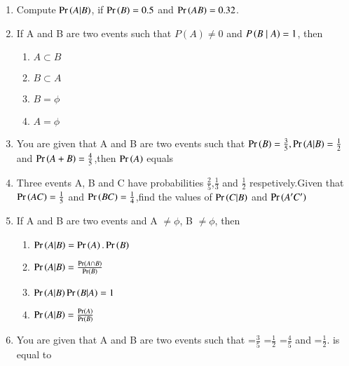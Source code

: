 \begin{enumerate}[label=\thesubsection.\arabic*,ref=\thesubsection.\theenumi]
\begin{enumerate}
\item {} \item {}
\end{enumerate}
\solution

\item Compute $\Pr\left(A|B\right)$, if $\Pr\left(B\right) = 0.5$ and $\Pr\left(AB\right) = 0.32$.\\
	\solution
	
	\item If A and B are two events such that $P(A) \neq 0$ and $P\left(B\mid A\right) = 1$, then
\begin{enumerate}
\item $A \subset B$\\
\item $B\subset A$\\
\item $B = \phi$\\
\item $A = \phi$\\
\end{enumerate}
		\solution
		
\item You are given that A and B are two events such that $\Pr\left(B\right)=\frac{3}{5},\Pr\left(A|B\right)=\frac{1}{2}$ and $\Pr\left(A+B\right)=\frac{4}{5}$,then $\Pr\left(A\right)$ equals\\
\solution

\item Three events A, B and C have probabilities $\frac{2}{5}$,$\frac{1}{3}$ and $\frac{1}{2}$ respetively.Given that $\Pr\left(AC\right)=\frac{1}{5}$ and $\Pr\left(BC\right)=\frac{1}{4}$,find the values of $\Pr\left(C | B\right)$ and $\Pr\left(A^{\prime} C^{\prime}\right)$\\
\solution

%
\item If A and B are two events and A $\ne \phi$, B $\ne \phi$, then
\begin{enumerate}
\setlength{\itemsep}{1ex}
	\item $\Pr\left(A|B\right) = \Pr\left(A\right).\Pr\left(B\right)$
	\item $\Pr\left(A|B\right) = \frac{\Pr\left(A\cap B\right)}{\Pr\left(B\right)}$
	\item $\Pr\left(A|B\right)\Pr\left(B|A\right) = 1$
	\item $\Pr\left(A|B\right) = \frac{\Pr\left(A\right)}{\Pr\left(B\right)}$
\end{enumerate}
\item You are given that A and B are two events such that =$\frac{3}{5}$ =$\frac{1}{2}$ =$\frac{4}{5}$ and =$\frac{1}{2}$.   is equal to
\end{enumerate}
